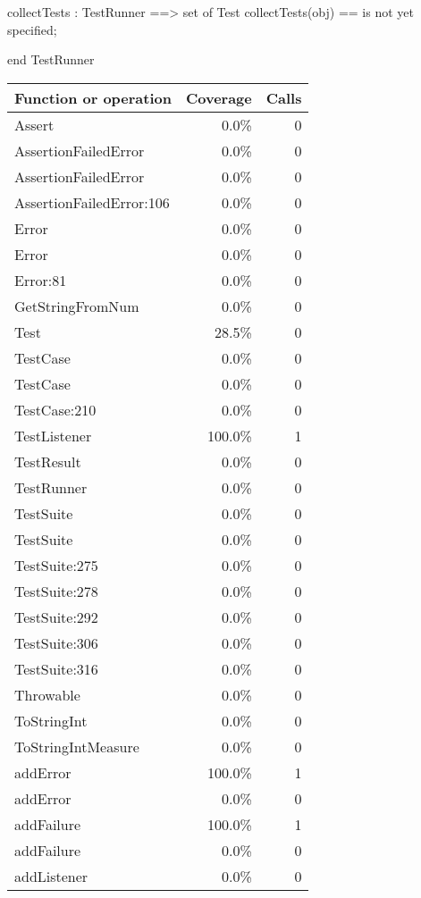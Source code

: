 \documentclass[a4paper]{article}
\begin{document}
\begin{vdm_al}
collectTests : TestRunner ==> set of Test
collectTests(obj) == is not yet specified;

end TestRunner
\end{vdm_al}
\bigskip
\begin{longtable}{|l|r|r|}
\hline
Function or operation & Coverage & Calls \\
\hline
\hline
Assert & 0.0\% & 0 \\
\hline
AssertionFailedError & 0.0\% & 0 \\
\hline
AssertionFailedError & 0.0\% & 0 \\
\hline
AssertionFailedError:106 & 0.0\% & 0 \\
\hline
Error & 0.0\% & 0 \\
\hline
Error & 0.0\% & 0 \\
\hline
Error:81 & 0.0\% & 0 \\
\hline
GetStringFromNum & 0.0\% & 0 \\
\hline
Test & 28.5\% & 0 \\
\hline
TestCase & 0.0\% & 0 \\
\hline
TestCase & 0.0\% & 0 \\
\hline
TestCase:210 & 0.0\% & 0 \\
\hline
TestListener & 100.0\% & 1 \\
\hline
TestResult & 0.0\% & 0 \\
\hline
TestRunner & 0.0\% & 0 \\
\hline
TestSuite & 0.0\% & 0 \\
\hline
TestSuite & 0.0\% & 0 \\
\hline
TestSuite:275 & 0.0\% & 0 \\
\hline
TestSuite:278 & 0.0\% & 0 \\
\hline
TestSuite:292 & 0.0\% & 0 \\
\hline
TestSuite:306 & 0.0\% & 0 \\
\hline
TestSuite:316 & 0.0\% & 0 \\
\hline
Throwable & 0.0\% & 0 \\
\hline
ToStringInt & 0.0\% & 0 \\
\hline
ToStringIntMeasure & 0.0\% & 0 \\
\hline
addError & 100.0\% & 1 \\
\hline
addError & 0.0\% & 0 \\
\hline
addFailure & 100.0\% & 1 \\
\hline
addFailure & 0.0\% & 0 \\
\hline
addListener & 0.0\% & 0 \\

\end{longtable}
\end{document}
